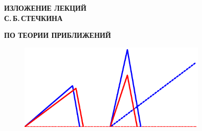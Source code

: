 \documentclass[12pt,twosize,openany]{book}
\begin{document}
\vspace{5cm}

\thispagestyle{empty}
\begin{center}
{\Huge{\textbf{ИЗЛОЖЕНИЕ ЛЕКЦИЙ }}}\\[10pt]

{\Huge{\textbf{С.\,Б.\,СТЕЧКИНА}}}\\[10pt]
\end{center}

{\Huge{\textbf{\hspace{-0.5cm}ПО ТЕОРИИ ПРИБЛИЖЕНИЙ}}}\\[10pt]



\vspace{2cm}

\begin{figure}[ht]
\begin{center}
\includegraphics[width=0.8\textwidth]{moln-2.5.eps}
\end{center}
 \bigskip
 \end{figure}
\end{document}
